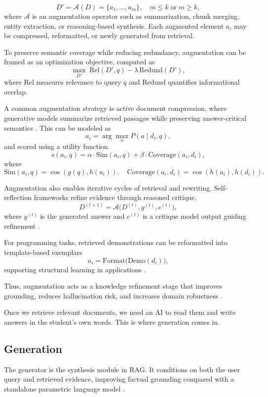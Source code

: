 \[
D' = \mathcal{A}(D) = \{ a_1, \dots, a_m \}, \quad m \leq k \; \text{or} \; m \geq k,
\]
where $\mathcal{A}$ is an augmentation operator such as summarization, chunk merging, entity extraction, or reasoning-based synthesis. Each augmented element $a_i$ may be compressed, reformatted, or newly generated from retrieval.

To preserve semantic coverage while reducing redundancy, augmentation can be framed as an optimization objective, computed as
\[
\max_{D'} \; \text{Rel}(D', q) - \lambda \, \text{Redund}(D'),
\]
where $\text{Rel}$ measures relevance to query $q$ and $\text{Redund}$ quantifies informational overlap.

A common augmentation strategy is active document compression, where generative models summarize retrieved passages while preserving answer-critical semantics \cite{yoon2024compact}. This can be modeled as
\[
a_i = \arg\max_{a} P(a \mid d_i, q),
\]
and scored using a utility function
\[
s(a_i, q) = \alpha \cdot \text{Sim}(a_i, q) + \beta \cdot \text{Coverage}(a_i, d_i),
\]
where
\[
\text{Sim}(a_i, q) = \cos(g(q), h(a_i)), \quad 
\text{Coverage}(a_i, d_i) = \cos(h(a_i), h(d_i)).
\]

Augmentation also enables iterative cycles of retrieval and rewriting. Self-reflection frameworks refine evidence through reasoned critique.
\[
D^{(t+1)} = \mathcal{A}\big(D^{(t)}, y^{(t)}, c^{(t)}\big),
\]
where $y^{(t)}$ is the generated answer and $c^{(t)}$ is a critique model output guiding refinement \cite{asai2023selfrag}.

For programming tasks, retrieved demonstrations can be reformatted into template-based exemplars
\[
a_i = \text{Format}\big(\text{Demo}(d_i)\big),
\]
supporting structural learning in applications \cite{he2024retrieval_coding}.

Thus, augmentation acts as a knowledge refinement stage that improves grounding, reduces hallucination risk, and increases domain robustness \cite{gao2023rag_survey}.

Once we retrieve relevant documents, we need an AI to read them and write answers in the student's own words. This is where generation comes in.

\subsection{Generation}

The generator is the synthesis module in RAG. It conditions on both the user query and retrieved evidence, improving factual grounding compared with a standalone parametric language model \cite{gao2023rag_survey}.

